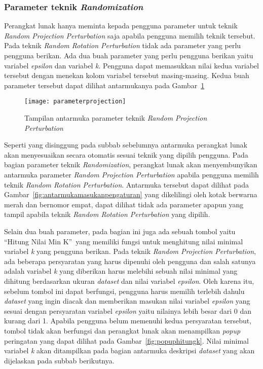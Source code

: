 \subsubsection{Parameter teknik \textit{Randomization}}
\label{subsubsec:parameterteknik}

Perangkat lunak hanya meminta kepada pengguna parameter untuk teknik \textit{Random Projection Perturbation} saja apabila pengguna memilih teknik tersebut. Pada teknik \textit{Random Rotation Perturbation} tidak ada parameter yang perlu pengguna berikan. Ada dua buah parameter yang perlu pengguna berikan yaitu variabel \textit{epsilon} dan variabel \textit{k}. Pengguna dapat memasukkan nilai kedua variabel tersebut dengan menekan kolom variabel tersebut masing-masing. Kedua buah parameter tersebut dapat dilihat antarmukanya pada Gambar~\ref{fig:parameterprojection}

\begin{figure}
	\centering
	\texttt{[image: parameterprojection]}
	\caption{Tampilan antarmuka parameter teknik \textit{Random Projection Perturbation}}
	\label{fig:parameterprojection}
\end{figure}

Seperti yang disinggung pada subbab sebelumnya antarmuka perangkat lunak akan menyesuaikan secara otomatis sesuai teknik yang dipilih pengguna. Pada bagian parameter teknik \textit{Randomization}, perangkat lunak akan menyembunyikan antarmuka parameter \textit{Random Projection Perturbation} apabila pengguna memilih teknik \textit{Random Rotation Perturbation}. Antarmuka tersebut dapat dilihat pada Gambar~\ref{fig:antarmukamasukanpengaturan} yang dikelilingi oleh kotak berwarna merah dan bernomor empat, dapat dilihat tidak ada parameter apapun yang tampil apabila teknik \textit{Random Rotation Perturbation} yang dipilih.

Selain dua buah parameter, pada bagian ini juga ada sebuah tombol yaitu \textquotedblleft Hitung Nilai Min K\textquotedblright~yang memiliki fungsi untuk menghitung nilai minimal variabel \textit{k} yang pengguna berikan. Pada teknik \textit{Random Projection Perturbation}, ada beberapa persyaratan yang harus dipenuhi oleh pengguna dan salah satunya adalah variabel \textit{k} yang diberikan harus melebihi sebuah nilai minimal yang dihitung berdasarkan ukuran \textit{dataset} dan nilai variabel \textit{epsilon}. Oleh karena itu, sebelum tombol ini dapat berfungsi, pengguna harus memilih terlebih dahulu \textit{dataset} yang ingin diacak dan memberikan masukan nilai variabel \textit{epsilon} yang sesuai dengan persyaratan variabel \textit{epsilon} yaitu nilainya lebih besar dari 0 dan kurang dari 1. Apabila pengguna belum memenuhi kedua persyaratan tersebut, tombol tidak akan berfungsi dan perangkat lunak akan menampilkan \textit{popup} peringatan yang dapat dilihat pada Gambar~\ref{fig:popuphitungk}. Nilai minimal variabel \textit{k} akan ditampilkan pada bagian antarmuka deskripsi \textit{dataset} yang akan dijelaskan pada subbab berikutnya.

